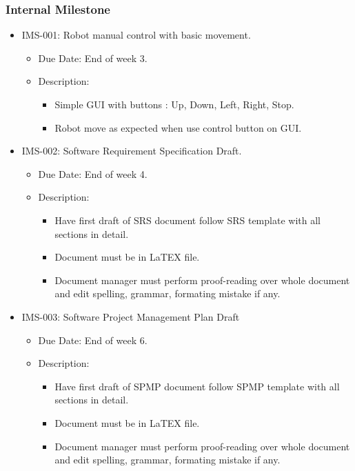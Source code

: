 	\subsubsection{Internal Milestone}
		\begin{itemize}
			\item IMS-001: Robot manual control with basic movement.
			\begin{itemize}
				\item Due Date: End of week 3.
				\item Description:
				\begin{itemize}
					\item Simple GUI with buttons : Up, Down, Left, Right, Stop.
					\item Robot move as expected when use control button on GUI.
				\end{itemize}
			\end{itemize}
			\item IMS-002: Software Requirement Specification Draft.
			\begin{itemize}
				\item Due Date: End of week 4.
				\item Description:
				\begin{itemize}
					\item Have first draft of SRS document follow SRS template with all sections in detail.
					\item Document must be in LaTEX file.
					\item Document manager must perform proof-reading over whole document and edit spelling, grammar, formating mistake if any.
				\end{itemize}
			\end{itemize}
			\item IMS-003: Software Project Management Plan Draft
			\begin{itemize}
				\item Due Date: End of week 6.
				\item Description:
				\begin{itemize}
					\item Have first draft of SPMP document follow SPMP template with all sections in detail.
					\item Document must be in LaTEX file.
					\item Document manager must perform proof-reading over whole document and edit spelling, grammar, formating mistake if any.
				\end{itemize}
			\end{itemize}

\end{itemize}
